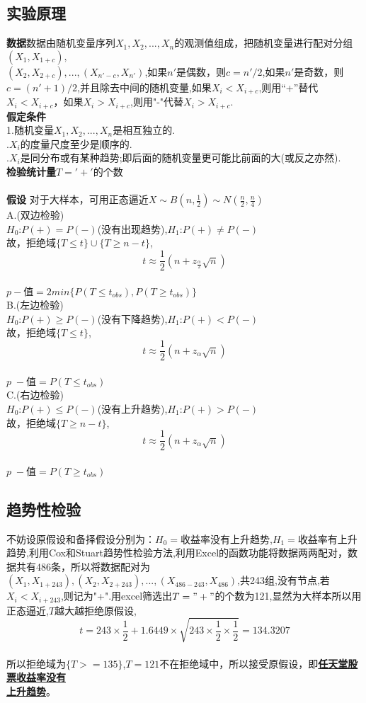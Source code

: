 \documentclass[a4paper, 11pt]{article}
\begin{document}
	\subsection{实验原理}
	\noindent\textbf{数据}\quad 数据由随机变量序列$X_{1},X_{2},...,X_{n}$的观测值组成，把随机变量进行配对分组$(X_{1},X_{1+c}),$\\$(X_{2},X_{2+c}),...,(X_{n'-c},X_{n'})$,如果$n'$是偶数，则$c=n'/2$,如果$n'$是奇数，则$c=(n'+1)/2$,并且除去中间的随机变量,如果$X_{i}<X_{i+c}$,则用“+”替代$X_{i}<X_{i+c}$，如果$X_{i}>X_{i+c}$,则用"-"代替$X_{i}>X_{i+c}$.\\
	\textbf{假定条件}\\
	\indent1.随机变量$X_{1},X_{2},...,X_{n}$是相互独立的.\\
	.$X_{i}$的度量尺度至少是顺序的.\\
	.$X_{i}$是同分布或有某种趋势;即后面的随机变量更可能比前面的大(或反之亦然).\\
	\textbf{检验统计量}\quad $T='+'$的个数\\
	\\\textbf{假设} \quad 对于大样本，可用正态逼近$X\sim B(n,\frac{1}{2})\sim N(\frac{n}{2},\frac{n}{4})$
	\\A.(双边检验)
	\\$ H_{0} $:$P(+)=P(-)$(没有出现趋势),$ H_{1} $:$P(+)\neq P(-)$
	\\故，拒绝域$\{T\leq t\}\cup\{T\geq n-t\}$,$$t\approx\frac{1}{2}(n+z_{\frac{\alpha}{2}}\sqrt{n})$$
	\\$p-$值$=2min\{P(T\leq t_{obs} ),P(T\geq t_{obs})\}$
	\\B.(左边检验)
	\\$ H_{0} $:$P(+)\geq P(-)$(没有下降趋势),$ H_{1} $:$P(+)< P(-)$
	\\故，拒绝域$\{T\leq t\}$,$$t\approx\frac{1}{2}(n+z_{\alpha}\sqrt{n})$$
	\\$p\;-$值$=P(T\leq t_{obs} )$
	\\C.(右边检验)
	\\$ H_{0} $:$P(+)\leq P(-)$(没有上升趋势),$ H_{1} $:$P(+)> P(-)$
	\\故，拒绝域$\{T\geq n-t\}$,$$t\approx\frac{1}{2}(n+z_{\alpha}\sqrt{n})$$
	\\$p\;-$值$=P(T\geq t_{obs})$
	\subsection{趋势性检验}
	不妨设原假设和备择假设分别为：$H_{0}=$收益率没有上升趋势,$H_{1}=$收益率有上升趋势,利用Cox和Stuart趋势性检验方法,利用Excel的函数功能将数据两两配对，数据共有486条，所以将数据配对为$(X_{1},X_{1+243}),(X_{2},X_{2+243}),...,(X_{486-243},X_{486})$,共243组,没有节点,若$X_{i}<X_{i+243}$,则记为"+".用excel筛选出$T="+"$的个数为121,显然为大样本所以用正态逼近,$ T $越大越拒绝原假设,
	$$t=243\times \frac{1}{2}+1.6449\times \sqrt{243\times \frac{1}{2}\times \frac{1}{2}}=134.3207$$
	\\所以拒绝域为$\{T>=135\}$,$T=121$不在拒绝域中，所以接受原假设，即\textbf{\underline{任天堂股票收益率没有}}\\\textbf{\underline{上升趋势}}。
\end{document}
